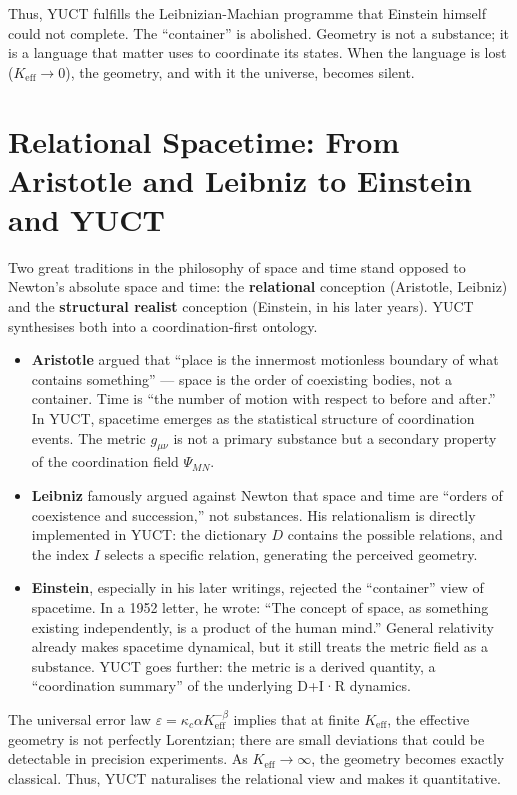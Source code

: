 \documentclass[12pt,a4paper]{article}
\begin{document}
	Thus, YUCT fulfills the Leibnizian-Machian programme that Einstein himself could not complete. The ``container'' is abolished. Geometry is not a substance; it is a language that matter uses to coordinate its states. When the language is lost (\(K_{\mathrm{eff}} \to 0\)), the geometry, and with it the universe, becomes silent.
	
	\section{Relational Spacetime: From Aristotle and Leibniz to Einstein and YUCT}
	
	Two great traditions in the philosophy of space and time stand opposed to Newton’s absolute space and time: the \textbf{relational} conception (Aristotle, Leibniz) and the \textbf{structural realist} conception (Einstein, in his later years). YUCT synthesises both into a coordination‑first ontology.
	
	\begin{itemize}
		\item \textbf{Aristotle} argued that “place is the innermost motionless boundary of what contains something” — space is the order of coexisting bodies, not a container. Time is “the number of motion with respect to before and after.” In YUCT, spacetime emerges as the statistical structure of coordination events. The metric \(g_{\mu\nu}\) is not a primary substance but a secondary property of the coordination field \(\Psi_{MN}\).
		
		\item \textbf{Leibniz} famously argued against Newton that space and time are “orders of coexistence and succession,” not substances. His relationalism is directly implemented in YUCT: the dictionary \(D\) contains the possible relations, and the index \(I\) selects a specific relation, generating the perceived geometry.
		
		\item \textbf{Einstein}, especially in his later writings, rejected the “container” view of spacetime. In a 1952 letter, he wrote: “The concept of space, as something existing independently, is a product of the human mind.” General relativity already makes spacetime dynamical, but it still treats the metric field as a substance. YUCT goes further: the metric is a derived quantity, a “coordination summary” of the underlying D+I·R dynamics.
	\end{itemize}
	
	The universal error law \(\varepsilon = \kappa_c \alpha K_{\mathrm{eff}}^{-\beta}\) implies that at finite \(K_{\mathrm{eff}}\), the effective geometry is not perfectly Lorentzian; there are small deviations that could be detectable in precision experiments. As \(K_{\mathrm{eff}} \to \infty\), the geometry becomes exactly classical. Thus, YUCT naturalises the relational view and makes it quantitative.
	
\end{document}
